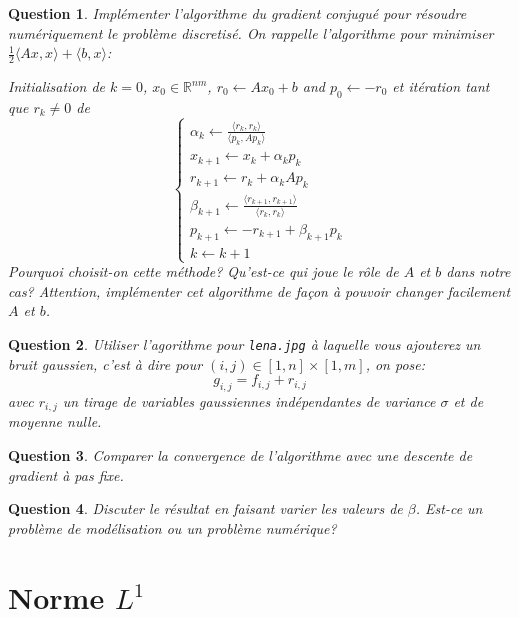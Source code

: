 \documentclass[10pt,a4paper,fleqn]{report}
\newcommand{\dotp}[2]{\langle #1 , #2\rangle}
\newcommand{\R}{\mathbb R}
\newtheorem{question}{Question}
\begin{document}
\begin{question}
Impl\'ementer l'algorithme du gradient conjugu\'e pour r\'esoudre num\'eriquement le probl\`eme discretis\'e. On rappelle l'algorithme pour minimiser $\frac12 \dotp{Ax}{x}+\dotp{b}{x}$:

Initialisation de $k=0$,
$x_0 \in \R^{nm}$,  $r_0 \leftarrow Ax_0 + b$ and $p_0 \leftarrow -r_0$ et it\'eration tant que $r_k\neq 0$ de
\begin{equation}
\begin{cases}
    \alpha_k \leftarrow \frac{\dotp{r_k}{r_k} }{ \dotp{p_k}{A p_k} } \\
    x_{k+1} \leftarrow x_k + \alpha_k p_k         \\
    r_{k+1} \leftarrow r_k + \alpha_k A p_k       \\
    \beta_{k+1} \leftarrow \frac{ \dotp{r_{k+1}}{r_{k+1}} }{ \dotp{r_k}{r_k} }   \\
    p_{k+1} \leftarrow -r_{k+1} + \beta_{k+1} p_k\\
    k \leftarrow k+1
\end{cases}
\end{equation}
Pourquoi choisit-on cette m\'ethode? Qu'est-ce qui joue le r\^ole de $A$ et $b$ dans notre cas?
Attention, impl\'ementer cet algorithme de fa\c{c}on \`a pouvoir changer facilement $A$ et $b$.
\end{question}

\begin{question}
Utiliser l'agorithme pour \texttt{lena.jpg} \`a laquelle vous ajouterez un bruit gaussien, c'est \`a dire pour $ (i,j)\in [1,n]\times[1,m]$, on pose:
\begin{equation}
g_{i,j} = f_{i,j} + r_{i,j} 
\end{equation}
avec $r_{i,j}$ un tirage de variables gaussiennes ind\'ependantes de variance $\sigma$ et de moyenne nulle.
\end{question}

\begin{question}
Comparer la convergence de l'algorithme avec une descente de gradient \`a pas fixe.
\end{question}

\begin{question}
Discuter le r\'esultat en faisant varier les valeurs de $\beta$. Est-ce un probl\`eme de mod\'elisation ou un problème num\'erique?
\end{question}


\section{Norme $L^{1}$}
\end{document}
